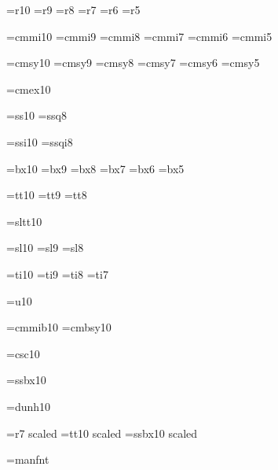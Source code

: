 %


\font\tenrm=\fontprefix r10 %
\font\preloaded=\fontprefix r9
\font\preloaded=\fontprefix r8
\font\sevenrm=\fontprefix r7
\font\preloaded=\fontprefix r6
\font\fiverm=\fontprefix r5

\font\teni=cmmi10 %
\font\preloaded=cmmi9
\font\preloaded=cmmi8
\font\seveni=cmmi7
\font\preloaded=cmmi6
\font\fivei=cmmi5

\font\tensy=cmsy10 %
\font\preloaded=cmsy9
\font\preloaded=cmsy8
\font\sevensy=cmsy7
\font\preloaded=cmsy6
\font\fivesy=cmsy5

\font\tenex=cmex10 %

\font\preloaded=\fontprefix ss10 %
\font\preloaded=\fontprefix ssq8

\font\preloaded=\fontprefix ssi10 %
\font\preloaded=\fontprefix ssqi8

\font\tenbf=\fontprefix bx10 %
\font\preloaded=\fontprefix bx9
\font\preloaded=\fontprefix bx8
\font\sevenbf=\fontprefix bx7
\font\preloaded=\fontprefix bx6
\font\fivebf=\fontprefix bx5

\font\tentt=\fontprefix tt10 %
\font\preloaded=\fontprefix tt9
\font\preloaded=\fontprefix tt8

\font\preloaded=\fontprefix sltt10 %

\font\tensl=\fontprefix sl10 %
\font\preloaded=\fontprefix sl9
\font\preloaded=\fontprefix sl8

\font\tenit=\fontprefix ti10 %
\font\preloaded=\fontprefix ti9
\font\preloaded=\fontprefix ti8
\font\preloaded=\fontprefix ti7

\font\preloaded=\fontprefix u10 %

\font\preloaded=cmmib10 %
\font\preloaded=cmbsy10 %

\font\preloaded=\fontprefix csc10 %

\font\preloaded=\fontprefix ssbx10 %

\font\preloaded=\fontprefix dunh10 %

\font\preloaded=\fontprefix r7 scaled  %
\font\preloaded=\fontprefix tt10 scaled 
\font\preloaded=\fontprefix ssbx10 scaled 

\font\preloaded=manfnt %


\let\preloaded=\undefined %

